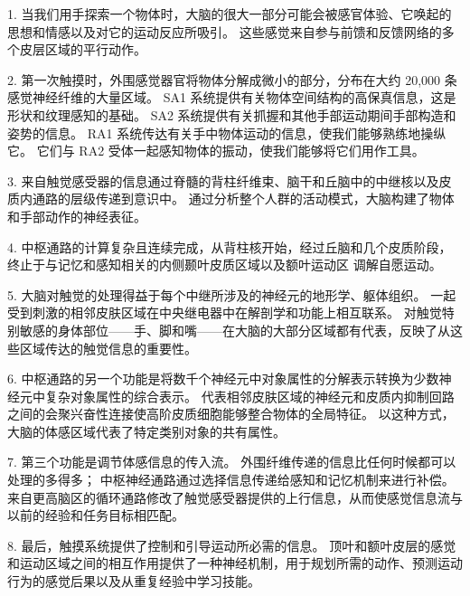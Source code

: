 1. 当我们用手探索一个物体时，大脑的很大一部分可能会被感官体验、它唤起的思想和情感以及对它的运动反应所吸引。
这些感觉来自参与前馈和反馈网络的多个皮层区域的平行动作。


2. 第一次触摸时，外围感觉器官将物体分解成微小的部分，分布在大约 20,000 条感觉神经纤维的大量区域。 
SA1 系统提供有关物体空间结构的高保真信息，这是形状和纹理感知的基础。
SA2 系统提供有关抓握和其他手部运动期间手部构造和姿势的信息。
RA1 系统传达有关手中物体运动的信息，使我们能够熟练地操纵它。
它们与 RA2 受体一起感知物体的振动，使我们能够将它们用作工具。 


3. 来自触觉感受器的信息通过脊髓的背柱纤维束、脑干和丘脑中的中继核以及皮质内通路的层级传递到意识中。 
通过分析整个人群的活动模式，大脑构建了物体和手部动作的神经表征。


4. 中枢通路的计算复杂且连续完成，从背柱核开始，经过丘脑和几个皮质阶段，终止于与记忆和感知相关的内侧颞叶皮质区域以及额叶运动区 调解自愿运动。


5. 大脑对触觉的处理得益于每个中继所涉及的神经元的地形学、躯体组织。
一起受到刺激的相邻皮肤区域在中央继电器中在解剖学和功能上相互联系。
对触觉特别敏感的身体部位——手、脚和嘴——在大脑的大部分区域都有代表，反映了从这些区域传达的触觉信息的重要性。 


6. 中枢通路的另一个功能是将数千个神经元中对象属性的分解表示转换为少数神经元中复杂对象属性的综合表示。
代表相邻皮肤区域的神经元和皮质内抑制回路之间的会聚兴奋性连接使高阶皮质细胞能够整合物体的全局特征。
以这种方式，大脑的体感区域代表了特定类别对象的共有属性。


7. 第三个功能是调节体感信息的传入流。
外围纤维传递的信息比任何时候都可以处理的多得多； 中枢神经通路通过选择信息传递给感知和记忆机制来进行补偿。
来自更高脑区的循环通路修改了触觉感受器提供的上行信息，从而使感觉信息流与以前的经验和任务目标相匹配。 


8. 最后，触摸系统提供了控制和引导运动所必需的信息。
顶叶和额叶皮层的感觉和运动区域之间的相互作用提供了一种神经机制，用于规划所需的动作、预测运动行为的感觉后果以及从重复经验中学习技能。



